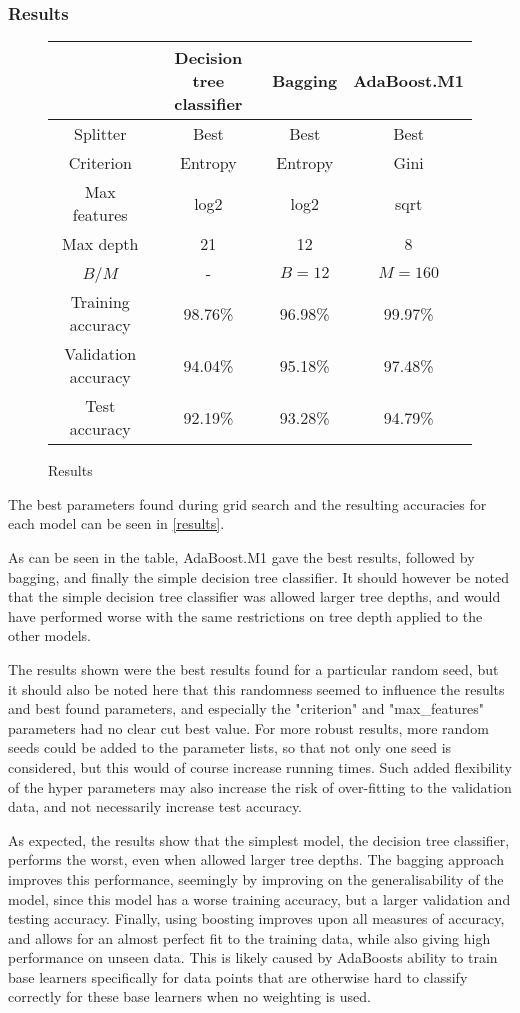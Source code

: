 \documentclass[a4paper, 12pt]{article}
\begin{document}
\subsubsection{Results}

\begin{figure}[h]
	\centering
	\caption{Results}
	\label{results}
	\begin{tabular}{|c||c|c|c|}
		\hline
		& Decision tree classifier & Bagging & AdaBoost.M1 \\
		\hline\hline
		Splitter & Best & Best & Best \\
		\hline
		Criterion & Entropy & Entropy & Gini \\
		\hline
		Max features & log2 & log2 & sqrt \\
		\hline
		Max depth & 21 & 12 & 8 \\
		\hline
		$B$/$M$& - & $B=12$ & $M=160$ \\
		\hline\hline
		Training accuracy & 98.76\% & 96.98\% & 99.97\% \\
		\hline
		Validation accuracy & 94.04\% & 95.18\% & 97.48\% \\
		\hline
		Test accuracy & 92.19\% & 93.28\% & 94.79\% \\
		\hline
	\end{tabular}
\end{figure}


The best parameters found during grid search and the resulting accuracies for each model can be seen in \autoref{results}.

As can be seen in the table, AdaBoost.M1 gave the best results, followed by bagging, and finally the simple decision tree classifier.
It should however be noted that the simple decision tree classifier was allowed larger tree depths, and would have performed worse with the same restrictions on tree depth applied to the other models.

The results shown were the best results found for a particular random seed, but it should also be noted here that this randomness seemed to influence the results and best found parameters, and especially the "criterion" and "max\_features" parameters had no clear cut best value. For more robust results, more random seeds could be added to the parameter lists, so that not only one seed is considered, but this would of course increase running times. Such added flexibility of the hyper parameters may also increase the risk of over-fitting to the validation data, and not necessarily increase test accuracy.

As expected, the results show that the simplest model, the decision tree classifier, performs the worst, even when allowed larger tree depths. The bagging approach improves this performance, seemingly by improving on the generalisability of the model, since this model has a worse training accuracy, but a larger validation and testing accuracy. Finally, using boosting improves upon all measures of accuracy, and allows for an almost perfect fit to the training data, while also giving high performance on unseen data. This is likely caused by AdaBoosts ability to train base learners specifically for data points that are otherwise hard to classify correctly for these base learners when no weighting is used.
\end{document}
